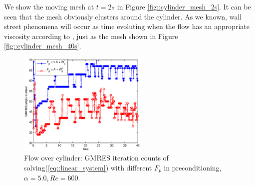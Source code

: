 \documentclass{eajam}
\begin{document}
      We show the moving mesh at $t = 2s$ in Figure
      \ref{fig::cylinder_mesh_2s}. It can be seen that the mesh obviously
      clusters around the cylinder. As we known, wall street phenomena
      will occur as time evoluting when the flow has an appropriate
      viscosity according to \cite{milton1982album}, just as the mesh
      shown in Figure \ref{fig::cylinder_mesh_40s}.
      
      \begin{figure}[!htbp]
        \begin{center}
          \includegraphics[width = 0.55\textwidth]{picture/obstacle_flow_data/comparation_NS_iterate_step.eps}
        \end{center}
        \caption{\small Flow over cylinder: GMRES iteration counts of
                 solving(\ref{eq::linear_system}) with different $F_p$ in
                 preconditioning, $\alpha = 5.0, Re = 600$.}
        \label{fig::cylinder_GMRES_steps_comparation}
      \end{figure}
      
\end{document}
